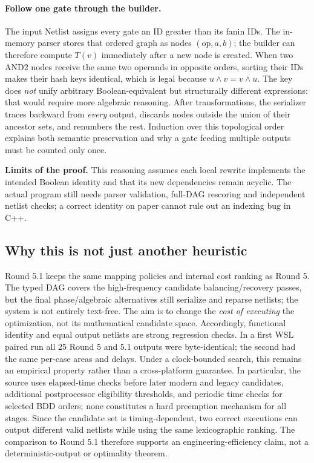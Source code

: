 \paragraph{Follow one gate through the builder.} The input Netlist assigns every gate an ID greater than its fanin IDs. The in-memory parser stores that ordered graph as nodes $(\mathrm{op},a,b)$; the builder can therefore compute $T(v)$ immediately after a new node is created. When two AND2 nodes receive the same two operands in opposite orders, sorting their IDs makes their hash keys identical, which is legal because $u\land v=v\land u$. The key does \emph{not} unify arbitrary Boolean-equivalent but structurally different expressions: that would require more algebraic reasoning. After transformations, the serializer traces backward from \emph{every} output, discards nodes outside the union of their ancestor sets, and renumbers the rest. Induction over this topological order explains both semantic preservation and why a gate feeding multiple outputs must be counted only once.\par
\textbf{Limits of the proof.} This reasoning assumes each local rewrite implements the intended Boolean identity and that its new dependencies remain acyclic. The actual program still needs parser validation, full-DAG rescoring and independent netlist checks; a correct identity on paper cannot rule out an indexing bug in C++.

\subsection{Why this is not just another heuristic}
Round 5.1 keeps the same mapping policies and internal cost ranking as Round 5. The typed DAG covers the high-frequency candidate balancing/recovery passes, but the final phase/algebraic alternatives still serialize and reparse netlists; the system is not entirely text-free. The aim is to change the \emph{cost of executing} the optimization, not its mathematical candidate space. Accordingly, functional identity and equal output netlists are strong regression checks. In a first WSL paired run all 25 Round 5 and 5.1 outputs were byte-identical; the second had the same per-case areas and delays. Under a clock-bounded search, this remains an empirical property rather than a cross-platform guarantee. In particular, the source uses elapsed-time checks before later modern and legacy candidates, additional postprocessor eligibility thresholds, and periodic time checks for selected BDD orders; none constitutes a hard preemption mechanism for all stages. Since the candidate set is timing-dependent, two correct executions can output different valid netlists while using the same lexicographic ranking. The comparison to Round 5.1 therefore supports an engineering-efficiency claim, not a deterministic-output or optimality theorem.


